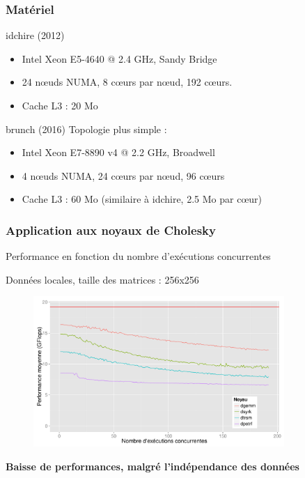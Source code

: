 \documentclass[xcolor={usenames,dvipsnames,svgnames,table}, aspectratio=43]{beamer}
\begin{document}
\begin{frame}
  \frametitle{Matériel}

  \begin{block}{idchire (2012)}
    \begin{itemize}
      \item Intel Xeon E5-4640 @ 2.4 GHz, Sandy Bridge
      \item 24 nœuds NUMA, 8 cœurs par nœud, 192 cœurs.
      \item Cache L3 : 20 Mo
    \end{itemize}
  \end{block}

  \begin{block}{brunch (2016)}
    Topologie plus simple :
    \begin{itemize}
      \item Intel Xeon E7-8890 v4 @ 2.2 GHz, Broadwell
      \item 4 nœuds NUMA, 24 cœurs par nœud, 96 cœurs
      \item Cache L3 : 60 Mo (similaire à idchire, 2.5 Mo par cœur)
    \end{itemize}
  \end{block}

\end{frame}



\begin{frame}
\frametitle{Application aux noyaux de Cholesky}

Performance en fonction du nombre d'exécutions concurrentes

Données locales, taille des matrices : 256x256
\begin{figure}
  \centering
  \includegraphics[width=0.85\textwidth]{graph/kernel_256_local_idchire.pdf}
\end{figure}

\textbf{Baisse de performances, malgré l'indépendance des données}

\end{frame}
\end{document}
